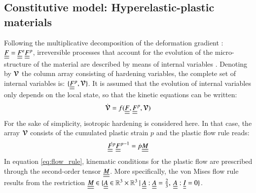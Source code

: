\subsection{Constitutive model: Hyperelastic-plastic materials}
\label{subsec:cont_constitutive}
Following the multiplicative decomposition of the deformation gradient \cite{Lee_FeFp}: ${\underline{\underline{F}}}={\underline{\underline{F}}}^e{\underline{\underline{F}}}^p$, irreversible processes that account for the evolution of the micro-structure of the material are described by means of internal variables \cite{Lubliner}.
Denoting by ${\boldsymbol{\mathcal{V}}}$ the column array consisting of hardening variables, the complete set of internal variables is: $\{{\underline{\underline{F}}}^p,{\boldsymbol{\mathcal{V}}} \}$.
It is assumed that the evolution of internal variables only depends on the local state, so that the kinetic equations can be written:
\begin{equation}
  \label{eq:plastic_kinetic_laws}
  \dot{{\boldsymbol{\mathcal{V}}}}=f({\underline{\underline{F}}},{\underline{\underline{F}}}^p,{\boldsymbol{\mathcal{V}}})
\end{equation}
For the sake of simplicity, isotropic hardening is considered here. %
In that case, the array ${\boldsymbol{\mathcal{V}}}$ consists of the cumulated plastic strain $p$ and the plastic flow rule reads:
\begin{equation}
  \label{eq:flow_rule}
  \dot{{\underline{\underline{F}}}^p}{{\underline{\underline{F}}}^p}^{-1}=\dot{p}{\underline{\underline{M}}}
\end{equation}
In equation \eqref{eq:flow_rule}, kinematic conditions for the plastic flow are prescribed through the second-order tensor ${\underline{\underline{M}}}$.
More specifically, the von Mises flow rule results from the restriction ${\underline{\underline{M}}} \in \{{\underline{\underline{A}}} \in \mathbb{R}^3\times \mathbb{R}^3\: \lvert\: {\underline{\underline{A}}}: {\underline{\underline{A}}}=\frac{2}{3},\: {\underline{\underline{A}}}:{\underline{\underline{I}}}=0\}$. 


